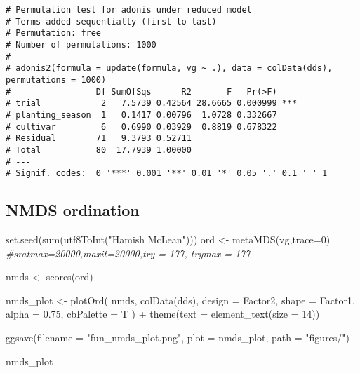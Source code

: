\documentclass[
]{article}
\newenvironment{Shaded}{\begin{snugshade}}{\end{snugshade}}
\newcommand{\AttributeTok}[1]{\textcolor[rgb]{0.77,0.63,0.00}{#1}}
\newcommand{\CommentTok}[1]{\textcolor[rgb]{0.56,0.35,0.01}{\textit{#1}}}
\newcommand{\DecValTok}[1]{\textcolor[rgb]{0.00,0.00,0.81}{#1}}
\newcommand{\FloatTok}[1]{\textcolor[rgb]{0.00,0.00,0.81}{#1}}
\newcommand{\FunctionTok}[1]{\textcolor[rgb]{0.00,0.00,0.00}{#1}}
\newcommand{\NormalTok}[1]{#1}
\newcommand{\OtherTok}[1]{\textcolor[rgb]{0.56,0.35,0.01}{#1}}
\newcommand{\SpecialCharTok}[1]{\textcolor[rgb]{0.00,0.00,0.00}{#1}}
\newcommand{\StringTok}[1]{\textcolor[rgb]{0.31,0.60,0.02}{#1}}
\begin{document}
\begin{verbatim}
# Permutation test for adonis under reduced model
# Terms added sequentially (first to last)
# Permutation: free
# Number of permutations: 1000
# 
# adonis2(formula = update(formula, vg ~ .), data = colData(dds), permutations = 1000)
#                 Df SumOfSqs      R2       F   Pr(>F)    
# trial            2   7.5739 0.42564 28.6665 0.000999 ***
# planting_season  1   0.1417 0.00796  1.0728 0.332667    
# cultivar         6   0.6990 0.03929  0.8819 0.678322    
# Residual        71   9.3793 0.52711                     
# Total           80  17.7939 1.00000                     
# ---
# Signif. codes:  0 '***' 0.001 '**' 0.01 '*' 0.05 '.' 0.1 ' ' 1
\end{verbatim}

\hypertarget{nmds-ordination}{%
\subsection{NMDS ordination}\label{nmds-ordination}}

\begin{Shaded}
\begin{Highlighting}[]
\FunctionTok{set.seed}\NormalTok{(}\FunctionTok{sum}\NormalTok{(}\FunctionTok{utf8ToInt}\NormalTok{(}\StringTok{"Hamish McLean"}\NormalTok{)))}
\NormalTok{ord }\OtherTok{\textless{}{-}} \FunctionTok{metaMDS}\NormalTok{(vg,}\AttributeTok{trace=}\DecValTok{0}\NormalTok{) }
\CommentTok{\#sratmax=20000,maxit=20000,try = 177, trymax = 177}

\NormalTok{nmds }\OtherTok{\textless{}{-}} \FunctionTok{scores}\NormalTok{(ord)}

\NormalTok{nmds\_plot }\OtherTok{\textless{}{-}} \FunctionTok{plotOrd}\NormalTok{(}
\NormalTok{  nmds, }\FunctionTok{colData}\NormalTok{(dds), }\AttributeTok{design =}\NormalTok{ Factor2, }
  \AttributeTok{shape =}\NormalTok{ Factor1, }\AttributeTok{alpha =} \FloatTok{0.75}\NormalTok{, }\AttributeTok{cbPalette =}\NormalTok{ T}
\NormalTok{) }\SpecialCharTok{+} \FunctionTok{theme}\NormalTok{(}\AttributeTok{text =} \FunctionTok{element\_text}\NormalTok{(}\AttributeTok{size =} \DecValTok{14}\NormalTok{))}

\FunctionTok{ggsave}\NormalTok{(}\AttributeTok{filename =} \StringTok{"fun\_nmds\_plot.png"}\NormalTok{, }\AttributeTok{plot =}\NormalTok{ nmds\_plot, }\AttributeTok{path =} \StringTok{"figures/"}\NormalTok{)}

\NormalTok{nmds\_plot}
\end{Highlighting}
\end{Shaded}
\end{document}
